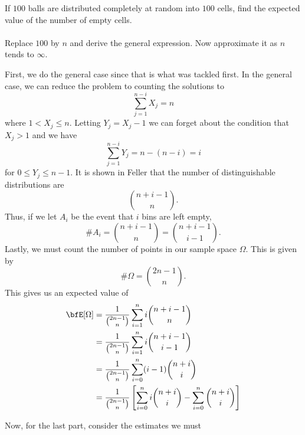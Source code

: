 \begin{problem}[Handout 1, \# 20]
  If \(100\) balls are distributed completely at random into \(100\) cells,
  find the expected value of the number of empty cells.
  \\\\
  Replace \(100\) by \(n\) and derive the general expression. Now
  approximate it as \(n\) tends to \(\infty\).
\end{problem}
\begin{solution}
  First, we do the general case since that is what was tackled first. In
  the general case, we can reduce the problem to counting the solutions to
  \[
    \sum_{j=1}^{n-i}X_j=n
  \]
  where \(1<X_j\leq n\). Letting \(Y_j=X_j-1\) we can forget about the
  condition that \(X_j>1\) and we have
  \[
    \sum_{j=1}^{n-i}Y_j=n-(n-i)=i
  \]
  for \(0\leq Y_j\leq n-1\). It is shown in Feller that the number of
  distinguishable distributions are
  \[
    \binom{n+i-1}{n}.
  \]
  Thus, if we let \(A_i\) be the event that \(i\) bins are left empty,
  \[
    \# A_i=\binom{n+i-1}{n}
    =\binom{n+i-1}{i-1}.
  \]
  Lastly, we must count the number of points in our sample space
  \(\Omega\). This is given by
  \[
    \#\Omega=%
    \binom{2n-1}{n}.
  \]
  This gives us an expected value of
  \begin{align*}
    \bfE[\Omega]
    &=\frac{1}{\binom{2n-1}{n}}\sum_{i=1}^ni\binom{n+i-1}{n}\\
    &=\frac{1}{\binom{2n-1}{n}}\sum_{i=1}^ni\binom{n+i-1}{i-1}\\
    &=\frac{1}{\binom{2n-1}{n}}\sum_{i=0}^n(i-1)\binom{n+i}{i}\\
    &=\frac{1}{\binom{2n-1}{n}}
      \left[\sum_{i=0}^ni\binom{n+i}{i}-\sum_{i=0}^n\binom{n+i}{i}\right]\\
  \end{align*}

  Now, for the last part, consider the estimates we must
\end{solution}

